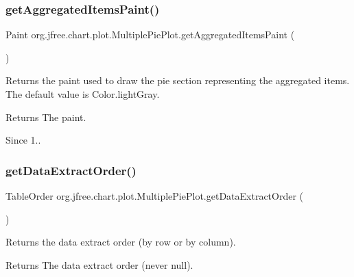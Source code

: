 \subsubsection{\texorpdfstring{get\+Aggregated\+Items\+Paint()}{getAggregatedItemsPaint()}}
{\footnotesize\ttfamily Paint org.\+jfree.\+chart.\+plot.\+Multiple\+Pie\+Plot.\+get\+Aggregated\+Items\+Paint (\begin{DoxyParamCaption}{ }\end{DoxyParamCaption})}

Returns the paint used to draw the pie section representing the aggregated items. The default value is {\ttfamily Color.\+light\+Gray}.

\begin{DoxyReturn}{Returns}
The paint.
\end{DoxyReturn}
\begin{DoxySince}{Since}
1.. 
\end{DoxySince}
\mbox{\label{classorg_1_1jfree_1_1chart_1_1plot_1_1_multiple_pie_plot_a7963c0f2d0a8d71ae77be0276a6be313}} 
\subsubsection{\texorpdfstring{get\+Data\+Extract\+Order()}{getDataExtractOrder()}}
{\footnotesize\ttfamily Table\+Order org.\+jfree.\+chart.\+plot.\+Multiple\+Pie\+Plot.\+get\+Data\+Extract\+Order (\begin{DoxyParamCaption}{ }\end{DoxyParamCaption})}

Returns the data extract order (by row or by column).

\begin{DoxyReturn}{Returns}
The data extract order (never {\ttfamily null}). 
\end{DoxyReturn}
\mbox{\label{classorg_1_1jfree_1_1chart_1_1plot_1_1_multiple_pie_plot_a8bd0f9380c87b13975efd9c62e9a8584}} 
